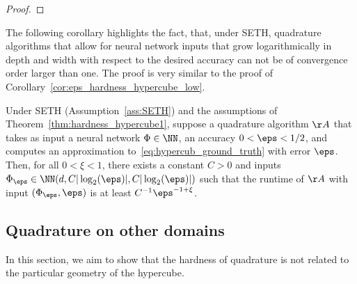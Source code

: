 \documentclass{amsart}[11pt]
\numberwithin{equation}{section}
\newcommand{\nn}{\mathcal{N}}
\newcommand{\order}{\mathcal{O}}
\newcommand{\worstTime}{T}
\numberwithin{theorem}{section}
\begin{document}
\begin{proof}
   
\end{proof}


The following corollary highlights the fact, that, under SETH, quadrature algorithms that allow for neural network inputs that grow logarithmically in depth and width with respect to the desired accuracy can not be of convergence order larger than one. The proof is very similar to the proof of Corollary~\ref{cor:eps_hardness_hypercube_low}.

\begin{corollary}\label{cor:eps_hardness_hypercube_high}
    Under SETH (Assumption~\ref{ass:SETH}) and the assumptions of Theorem~\ref{thm:hardness_hypercube1}, suppose a quadrature algorithm $\AA$ that takes as input a neural network $\Phi \in \NN$, an accuracy $0 < \eps < 1/2$, and computes an approximation to~\eqref{eq:hypercub_ground_truth} with error $\eps$. Then, for all $0 < \xi < 1$, there exists a constant $C > 0$ and inputs $\Phi_\eps\in \NN(d,C |\log_2(\eps)|, C |\log_2(\eps)|)$ such that the runtime of $\AA$ with input $(\Phi_\eps,\eps)$ is at least $C^{-1} \eps^{-1+\xi}$.
\end{corollary}

\subsection{Quadrature on other domains}
In this section, we aim to show that the hardness of quadrature is not related to the particular geometry of the hypercube. 
\end{document}
